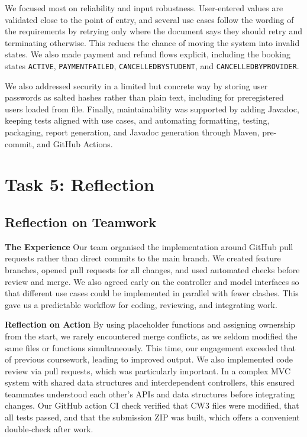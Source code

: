 \documentclass[11pt,a4paper]{article}
\begin{document}
We focused most on reliability and input robustness. User-entered values are validated
close to the point of entry, and several use cases follow the wording of the requirements
by retrying only where the document says they should retry and terminating otherwise.
This reduces the chance of moving the system into invalid states. We also made payment
and refund flows explicit, including the booking states \texttt{ACTIVE},
\texttt{PAYMENTFAILED}, \texttt{CANCELLEDBYSTUDENT}, and
\texttt{CANCELLEDBYPROVIDER}.

We also addressed security in a limited but concrete way by storing user passwords as
salted hashes rather than plain text, including for preregistered users loaded from file.
Finally, maintainability was supported by adding Javadoc, keeping tests aligned with use
cases, and automating formatting, testing, packaging, report generation, and Javadoc
generation through Maven, pre-commit, and GitHub Actions.

\newpage

\section{Task 5: Reflection}

\subsection{Reflection on Teamwork}

\noindent

\textbf{The Experience}
Our team organised the implementation around GitHub pull requests rather than direct commits to the main branch. We created feature branches, opened pull requests for all changes, and used automated checks before review and merge. We also agreed early on the controller and model interfaces so that different use cases could be implemented in parallel with fewer clashes. This gave us a predictable workflow for coding, reviewing, and integrating work.

\textbf{Reflection on Action}
By using placeholder functions and assigning ownership from the start, we rarely encountered merge conflicts, as we seldom modified the same files or functions simultaneously.
This time, our engagement exceeded that of previous coursework, leading to improved output.
We also implemented code review via pull requests, which was particularly important.
In a complex MVC system with shared data structures and interdependent controllers, this ensured teammates understood each other's APIs and data structures before integrating changes.
Our GitHub action CI check verified that CW3 files were modified, that all tests passed, and that the submission ZIP was built, which offers a convenient double-check after work.
\end{document}
